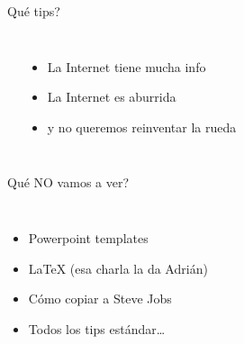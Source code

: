 \documentclass{beamer}
\begin{document}
\begin{frame}{Qu\'e tips?}
\begin{columns}[onlytextwidth]
    \begin{center}
    \end{center}
    \begin{itemize}
        \item La Internet tiene mucha info \ \bigskip
        \item La Internet es aburrida \ \bigskip
        \item y no queremos reinventar la rueda \ \bigskip
    \end{itemize}
\end{columns}
\end{frame}


\begin{frame}{Qu\'e NO vamos a ver?}
\begin{columns}[onlytextwidth]
    \begin{itemize}
        \item Powerpoint templates \ \bigskip
        \item LaTeX (esa charla la da Adri\'an) \ \bigskip
        \item C\'omo copiar a Steve Jobs \ \bigskip
        \item Todos los tips est\'andar\ldots
    \end{itemize}
    \begin{center}
    \end{center}
\end{columns}
\end{frame}
\end{document}
